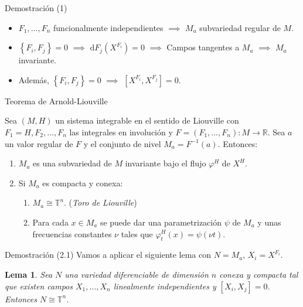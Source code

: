 \documentclass[mathserif]{beamer}
\newtheorem{lema}{Lema}
\newcommand{\dd}{\mathrm{d}}
\newcommand{\TT}{\mathbb{T}}
\newcommand{\RR}{\mathbb{R}}
\begin{document}
\begin{frame}{Demostración (1)}
  \begin{itemize}
    \item $F_1,\dots,F_n$ funcionalmente independientes $\implies$ $M_a$ subvariedad regular de $M$.
    \item $\left\{ F_i,F_j \right\}=0$ $\implies$ $\dd F_j(X^{F_i})=0$ $\implies$ Campos tangentes a $M_a$ $\implies$ $M_a$ invariante.
    \item Además, $\left\{ F_i,F_j \right\}=0$ $\implies$ $\left[ X^{F_i},X^{F_j} \right]=0$.
  \end{itemize}
\end{frame}

\begin{frame}{Teorema de Arnold-Liouville}
  \begin{theorem}
  Sea $(M,H)$ un sistema integrable en el sentido de Liouville con $F_1=H,F_2,\dots,F_n$ las integrales en involución y $F=(F_1,\dots,F_n):M\rightarrow \RR$. Sea $a$ un valor regular de $F$ y el conjunto de nivel $M_a=F^{-1}(a)$. 
  Entonces:
  \begin{enumerate}
    \item $M_a$ es una subvariedad de $M$ invariante bajo el flujo $\varphi^H$ de $X^H$.
    \item Si $M_a$ es compacta y conexa:
      \begin{enumerate}
	\item $M_a\cong \TT^n$. (\emph{Toro de Liouville})
	\item Para cada $x\in M_a$ se puede dar una parametrización $\psi$ de $M_a$ y unas frecuencias constantes $\nu$ tales que $\varphi_t^H(x)=\psi(\nu t)$.
      \end{enumerate}
  \end{enumerate}
\end{theorem}
\end{frame}

\begin{frame}{Demostración (2.1)}
  Vamos a aplicar el siguiente lema con $N=M_a$, $X_i=X^{F_i}$.

  \begin{lema}
  Sea $N$ una variedad diferenciable de dimensión $n$ conexa y compacta tal que existen campos $X_1,\dots,X_n$ linealmente independientes y $\left[ X_i,X_j \right]=0$. Entonces $N\cong \TT^n$.
  \end{lema}
\end{frame}
\end{document}
